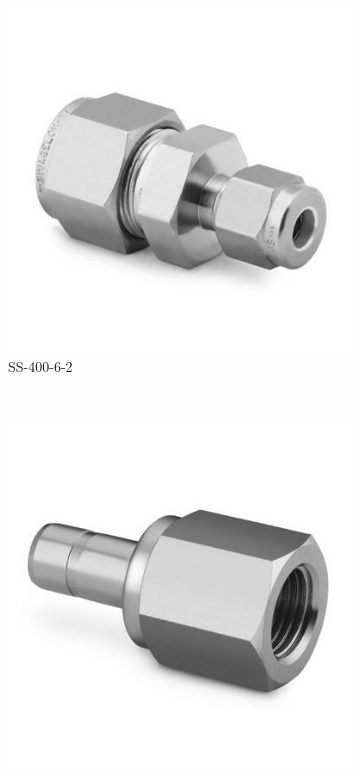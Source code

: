 \documentclass[a4paper,12pt,oneside]{article}
\begin{document}
\begin{appendices}
\begin{figure}[H]
    \centering
    \begin{subfigure}[b]{0.21\textwidth}
    \centering
    \includegraphics[width=\textwidth]{appendix/img/interfaces/SS-400-6-2.jpg}
    \caption{SS-400-6-2}
    \end{subfigure}
    ~
    \begin{subfigure}[b]{0.21\textwidth}
    \centering
    \includegraphics[width=\textwidth]{appendix/img/interfaces/SS-4-TA-7-4RG.jpg}

\end{subfigure}
\end{figure}
\end{appendices}
\end{document}
